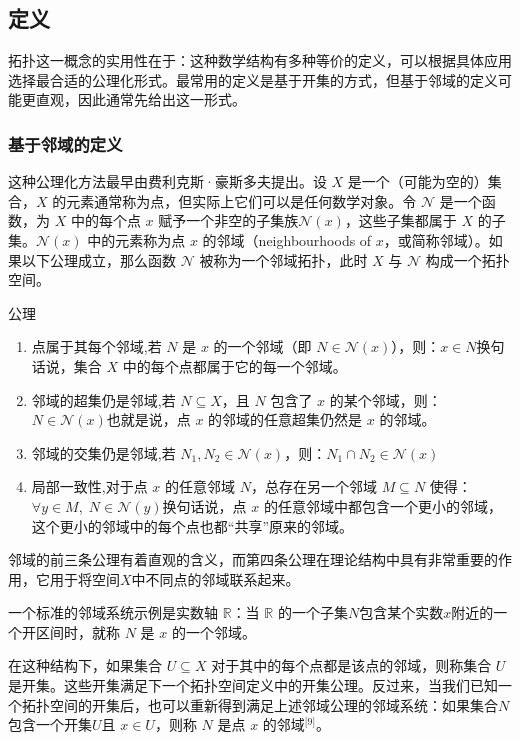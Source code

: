 \subsection{定义}
拓扑这一概念的实用性在于：这种数学结构有多种等价的定义，可以根据具体应用选择最合适的公理化形式。最常用的定义是基于开集的方式，但基于邻域的定义可能更直观，因此通常先给出这一形式。
\subsubsection{基于邻域的定义}
这种公理化方法最早由费利克斯·豪斯多夫提出。设 $X$ 是一个（可能为空的）集合，$X$ 的元素通常称为点，但实际上它们可以是任何数学对象。令 $\mathcal{N}$ 是一个函数，为 $X$ 中的每个点 $x$ 赋予一个非空的子集族$\mathcal{N}(x)$，这些子集都属于 $X$ 的子集。$\mathcal{N}(x)$ 中的元素称为点 $x$ 的邻域（neighbourhoods of $x$，或简称邻域）。如果以下公理成立，那么函数 $\mathcal{N}$ 被称为一个邻域拓扑，此时 $X$ 与 $\mathcal{N}$ 构成一个拓扑空间。

公理
\begin{enumerate}
\item 点属于其每个邻域,若 $N$ 是 $x$ 的一个邻域（即 $N \in \mathcal{N}(x)$），则：$x \in N$换句话说，集合 $X$ 中的每个点都属于它的每一个邻域。
\item 邻域的超集仍是邻域,若 $N \subseteq X$，且 $N$ 包含了 $x$ 的某个邻域，则：$N \in \mathcal{N}(x)$也就是说，点 $x$ 的邻域的任意超集仍然是 $x$ 的邻域。
\item 邻域的交集仍是邻域,若 $N_1, N_2 \in \mathcal{N}(x)$，则：$N_1 \cap N_2 \in \mathcal{N}(x)$
\item 局部一致性,对于点 $x$ 的任意邻域 $N$，总存在另一个邻域 $M \subseteq N$ 使得：$\forall y \in M, \; N \in \mathcal{N}(y)$换句话说，点 $x$ 的任意邻域中都包含一个更小的邻域，这个更小的邻域中的每个点也都“共享”原来的邻域。
\end{enumerate}
邻域的前三条公理有着直观的含义，而第四条公理在理论结构中具有非常重要的作用，它用于将空间$X$中不同点的邻域联系起来。

一个标准的邻域系统示例是实数轴 $\mathbb{R}$：当 $\mathbb{R}$ 的一个子集$N$包含某个实数$x$附近的一个开区间时，就称 $N$ 是 $x$ 的一个邻域。

在这种结构下，如果集合 $U \subseteq X$ 对于其中的每个点都是该点的邻域，则称集合 $U$ 是开集。这些开集满足下一个拓扑空间定义中的开集公理。反过来，当我们已知一个拓扑空间的开集后，也可以重新得到满足上述邻域公理的邻域系统：如果集合$N$包含一个开集$U$且 $x \in U$，则称 $N$ 是点 $x$ 的邻域\(^\text{[9]}\)。
